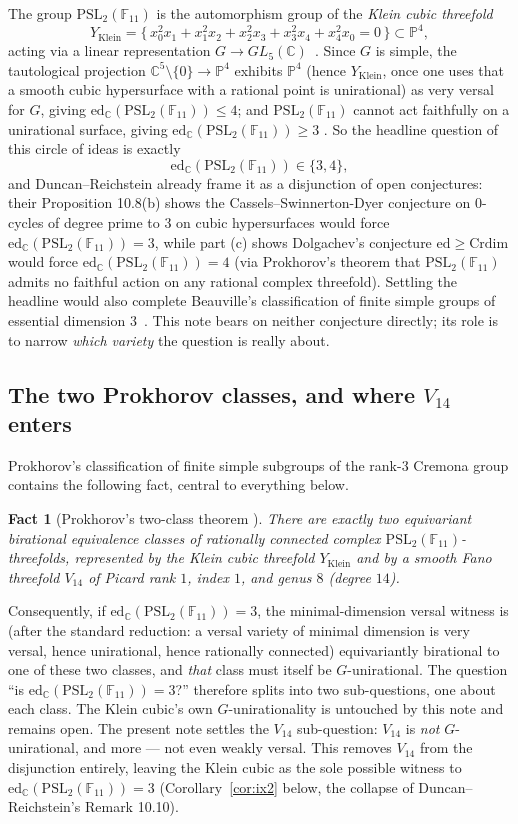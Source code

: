 \documentclass[11pt]{article}
\theoremstyle{plain}
\newtheorem{fact}[theorem]{Fact}
\theoremstyle{definition}
\theoremstyle{remark}
\newcommand{\PSL}{\mathrm{PSL}_2(\mathbb{F}_{11})}
\newcommand{\edC}{\mathrm{ed}_{\mathbb C}}
\newcommand{\PP}{\mathbb P}
\begin{document}
The group $\PSL$ is the automorphism group of the \emph{Klein cubic
threefold}
\[
Y_{\mathrm{Klein}} = \{\, x_0^2x_1+x_1^2x_2+x_2^2x_3+x_3^2x_4+x_4^2x_0=0
\,\}\subset \PP^4,
\]
acting via a linear representation $G\to GL_5(\mathbb C)$~\cite{Adler}.
Since $G$ is simple, the tautological projection $\mathbb C^5\setminus\{0\}
\to \PP^4$ exhibits $\PP^4$ (hence $Y_{\mathrm{Klein}}$, once one uses
that a smooth cubic hypersurface with a rational point is unirational)
as very versal for $G$, giving $\edC(\PSL)\le 4$; and $\PSL$ cannot act
faithfully on a unirational surface, giving $\edC(\PSL)\ge 3$
\cite[Prop.\ 10.8]{DR}. So the headline question of this circle of ideas
is exactly
\[
\edC(\PSL) \in \{3,4\},
\]
and Duncan--Reichstein already frame it as a disjunction of open
conjectures: their Proposition 10.8(b) shows the Cassels--Swinnerton-Dyer
conjecture on $0$-cycles of degree prime to $3$ on cubic hypersurfaces
would force $\edC(\PSL)=3$, while part (c) shows Dolgachev's conjecture
$\mathrm{ed}\ge\mathrm{Crdim}$ would force $\edC(\PSL)=4$ (via
Prokhorov's theorem that $\PSL$ admits no faithful action on any
rational complex threefold). Settling the headline would also complete
Beauville's classification of finite simple groups of essential
dimension $3$~\cite{Beauville}. This note bears on neither conjecture
directly; its role is to narrow \emph{which variety} the question is
really about.

\subsection{The two Prokhorov classes, and where \texorpdfstring{$V_{14}$}{V14} enters}

Prokhorov's classification of finite simple subgroups of the rank-$3$
Cremona group contains the following fact, central to everything below.

\begin{fact}[Prokhorov's two-class theorem {\cite[Thm.\ 1.5]{Prokhorov}}]
\label{fact:prokhorov}
There are exactly two equivariant birational equivalence classes of
rationally connected complex $\PSL$-threefolds, represented by the
Klein cubic threefold $Y_{\mathrm{Klein}}$ and by a smooth Fano
threefold $V_{14}$ of Picard rank $1$, index $1$, and genus $8$ (degree
$14$).
\end{fact}

Consequently, if $\edC(\PSL)=3$, the minimal-dimension versal witness is
(after the standard reduction: a versal variety of minimal dimension is
very versal, hence unirational, hence rationally connected) equivariantly
birational to one of these two classes, and \emph{that} class must
itself be $G$-unirational. The question ``is $\edC(\PSL)=3$?'' therefore
splits into two sub-questions, one about each class. The Klein cubic's
own $G$-unirationality is untouched by this note and remains open. The
present note settles the $V_{14}$ sub-question: $V_{14}$ is \emph{not}
$G$-unirational, and more --- not even weakly versal. This removes
$V_{14}$ from the disjunction entirely, leaving the Klein cubic as the
sole possible witness to $\edC(\PSL)=3$ (Corollary~\ref{cor:ix2} below,
the collapse of Duncan--Reichstein's Remark 10.10).
\end{document}
